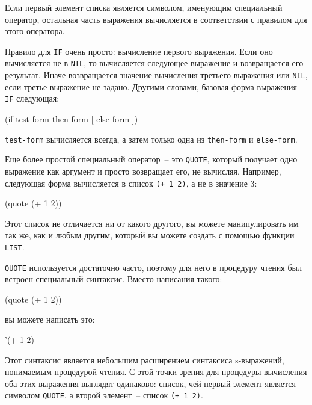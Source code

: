 Если первый элемент списка является символом, именующим специальный оператор, остальная
часть выражения вычисляется в соответствии с правилом для этого оператора.

Правило для \lstinline{IF} очень просто: вычисление первого выражения. Если оно вычисляется
не в \lstinline{NIL}, то вычисляется следующее выражение и возвращается его результат. Иначе
возвращается значение вычисления третьего выражения или \lstinline{NIL}, если третье
выражение не задано. Другими словами, базовая форма выражения \lstinline{IF} следующая:

\begin{myverb}
(if test-form then-form [ else-form ])
\end{myverb}

\noindent{}\lstinline{test-form} вычисляется всегда, а затем только одна из \lstinline{then-form} и
\lstinline{else-form}.

Еще более простой специальный оператор~-- это \lstinline{QUOTE}, который получает одно
выражение как аргумент и просто возвращает его, не вычисляя. Например, следующая форма
вычисляется в список \lstinline{(+ 1 2)}, а не в значение 3:

\begin{myverb}
(quote (+ 1 2))
\end{myverb}

Этот список не отличается ни от какого другого, вы можете манипулировать им так же, как и
любым другим, который вы можете создать с помощью функции
\lstinline{LIST}.

\lstinline{QUOTE} используется достаточно часто, поэтому для него в процедуру чтения был
встроен специальный синтаксис. Вместо написания такого:

\begin{myverb}
(quote (+ 1 2))
\end{myverb}

\noindent{}вы можете написать это:

\begin{myverb}
'(+ 1 2)
\end{myverb}

Этот синтаксис является небольшим расширением синтаксиса s-выражений, понимаемым
процедурой чтения. С этой точки зрения для процедуры вычисления оба этих выражения
выглядят одинаково: список, чей первый элемент является символом \lstinline{QUOTE}, а второй
элемент~-- список \lstinline{(+ 1 2)}.

